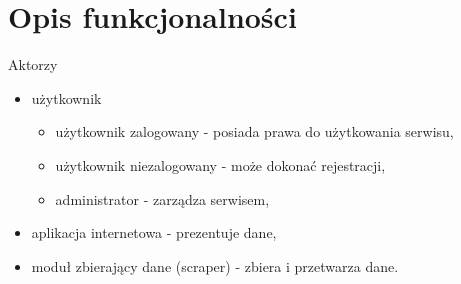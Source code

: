 \documentclass[12pt, titlepage]{article}
\begin{document}
	\section{Opis funkcjonalności}
	{\large Aktorzy
	\begin{itemize}
		\item użytkownik
			\begin{itemize}
				\item użytkownik zalogowany - posiada prawa do użytkowania serwisu,
				\item użytkownik niezalogowany - może dokonać rejestracji,
				\item administrator - zarządza serwisem,
			\end{itemize}
		\item aplikacja internetowa - prezentuje dane,
		\item moduł zbierający dane (scraper) - zbiera i przetwarza dane.
	\end{itemize}}
\end{document}

